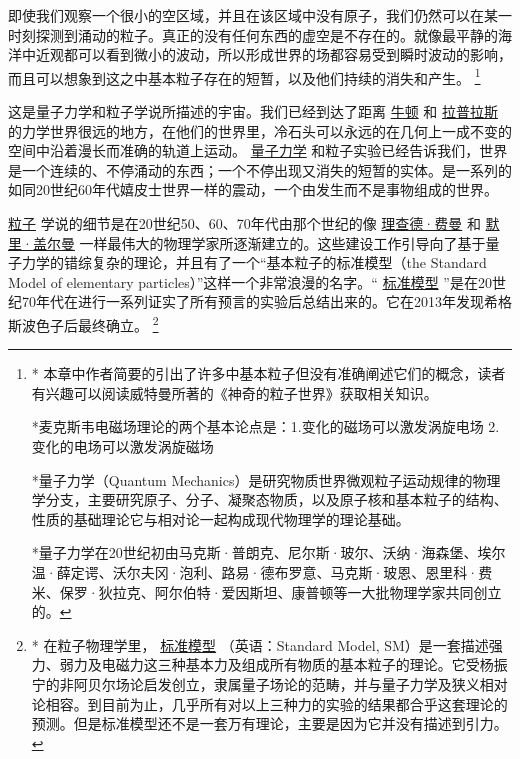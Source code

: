      即使我们观察一个很小的空区域，并且在该区域中没有原子，我们仍然可以在某一时刻探测到涌动的粒子。真正的没有任何东西的虚空是不存在的。就像最平静的海洋中近观都可以看到微小的波动，所以形成世界的场都容易受到瞬时波动的影响，而且可以想象到这之中基本粒子存在的短暂，以及他们持续的消失和产生。
\footnote[1]
{
* 本章中作者简要的引出了许多中基本粒子但没有准确阐述它们的概念，读者有兴趣可以阅读威特曼所著的《神奇的粒子世界》获取相关知识。

*麦克斯韦电磁场理论的两个基本论点是：1.变化的磁场可以激发涡旋电场 2.变化的电场可以激发涡旋磁场

*量子力学（Quantum Mechanics）是研究物质世界微观粒子运动规律的物理学分支，主要研究原子、分子、凝聚态物质，以及原子核和基本粒子的结构、性质的基础理论它与相对论一起构成现代物理学的理论基础。

*量子力学在20世纪初由马克斯·普朗克、尼尔斯·玻尔、沃纳·海森堡、埃尔温·薛定谔、沃尔夫冈·泡利、路易·德布罗意、马克斯·玻恩、恩里科·费米、保罗·狄拉克、阿尔伯特·爱因斯坦、康普顿等一大批物理学家共同创立的。
}
 
    这是量子力学和粒子学说所描述的宇宙。我们已经到达了距离
\href{http://toyhouse.cc/wiki/index.php/牛顿}{牛顿}
和
\href{http://toyhouse.cc/wiki/index.php/拉普拉斯}{拉普拉斯}
的力学世界很远的地方，在他们的世界里，冷石头可以永远的在几何上一成不变的空间中沿着漫长而准确的轨道上运动。
\href{http://toyhouse.cc/wiki/index.php/量子力学}{量子力学}
和粒子实验已经告诉我们，世界是一个连续的、不停涌动的东西；一个不停出现又消失的短暂的实体。是一系列的如同20世纪60年代嬉皮士世界一样的震动，一个由发生而不是事物组成的世界。
     
\href{http://toyhouse.cc/wiki/index.php/粒子}{粒子}
学说的细节是在20世纪50、60、70年代由那个世纪的像
\href{http://toyhouse.cc/wiki/index.php/理查德·费曼}{理查德·费曼}
和
\href{http://toyhouse.cc/wiki/index.php/默里·盖尔曼}{默里·盖尔曼}
一样最伟大的物理学家所逐渐建立的。这些建设工作引导向了基于量子力学的错综复杂的理论，并且有了一个“基本粒子的标准模型（the Standard Model of elementary particles）”这样一个非常浪漫的名字。“
\href{http://toyhouse.cc/wiki/index.php/标准模型}{标准模型}
”是在20世纪70年代在进行一系列证实了所有预言的实验后总结出来的。它在2013年发现希格斯波色子后最终确立。
\footnote[2]
{
* 在粒子物理学里，
\href{http://toyhouse.cc/wiki/index.php/标准模型}{标准模型}
（英语：Standard Model, SM）是一套描述强力、弱力及电磁力这三种基本力及组成所有物质的基本粒子的理论。它受杨振宁的非阿贝尔场论启发创立，隶属量子场论的范畴，并与量子力学及狭义相对论相容。到目前为止，几乎所有对以上三种力的实验的结果都合乎这套理论的预测。但是标准模型还不是一套万有理论，主要是因为它并没有描述到引力。
}

